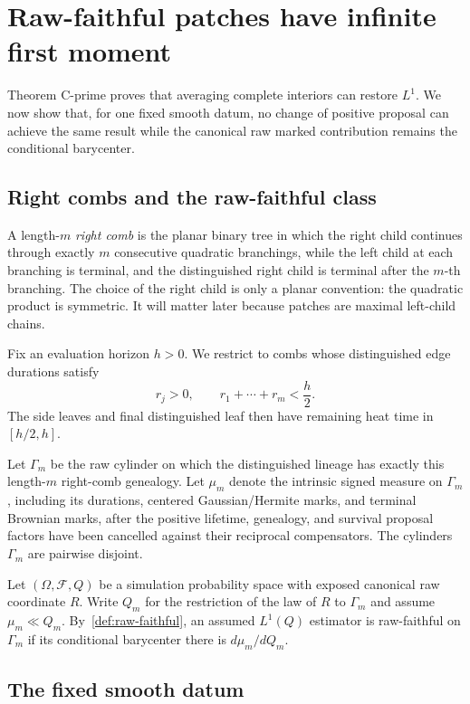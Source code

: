 \section{Raw-faithful patches have infinite first moment}
\label{sec:raw-faithful}

Theorem C-prime proves that averaging complete interiors can restore $L^1$. We now show that, for one fixed smooth datum, no change of positive proposal can achieve the same result while the canonical raw marked contribution remains the conditional barycenter.

\subsection{Right combs and the raw-faithful class}

A length-$m$ \emph{right comb} is the planar binary tree in which the right child continues through exactly $m$ consecutive quadratic branchings, while the left child at each branching is terminal, and the distinguished right child is terminal after the $m$-th branching. The choice of the right child is only a planar convention: the quadratic product is symmetric. It will matter later because patches are maximal left-child chains.

Fix an evaluation horizon $h>0$. We restrict to combs whose distinguished edge durations satisfy
\begin{equation*}
  r_j>0,
  \qquad
  r_1+\cdots+r_m<\frac h2.
\end{equation*}
The side leaves and final distinguished leaf then have remaining heat time in $[h/2,h]$.

Let $\Gamma_m$ be the raw cylinder on which the distinguished lineage has exactly this length-$m$ right-comb genealogy. Let $\mu_m$ denote the intrinsic signed measure on $\Gamma_m$, including its durations, centered Gaussian/Hermite marks, and terminal Brownian marks, after the positive lifetime, genealogy, and survival proposal factors have been cancelled against their reciprocal compensators. The cylinders $\Gamma_m$ are pairwise disjoint.

Let $(\Omega,\mathcal F,Q)$ be a simulation probability space with exposed canonical raw coordinate $R$. Write $Q_m$ for the restriction of the law of $R$ to $\Gamma_m$ and assume $\mu_m\ll Q_m$. By~\cref{def:raw-faithful}, an assumed $L^1(Q)$ estimator is raw-faithful on $\Gamma_m$ if its conditional barycenter there is $d\mu_m/dQ_m$.

\subsection{The fixed smooth datum}

